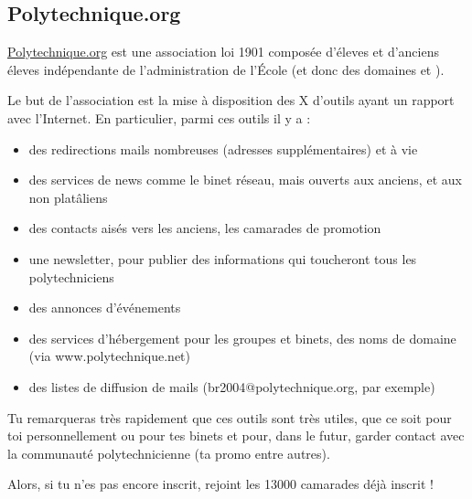 \subsection{Polytechnique.org}
\url{Polytechnique.org} est une association loi 1901 compos\'ee d'\'eleves et d'anciens \'eleves 
 ind\'ependante de l'administration de l'\'Ecole (et donc des domaines 
 et ).


Le but de l'association est la mise \`a disposition des X d'outils ayant un rapport avec l'Internet. En particulier, parmi ces outils il y a :
\begin{itemize}
  \item des redirections mails nombreuses (adresses suppl\'ementaires) et \`a vie
  \item des services de news comme le binet r\'eseau, mais ouverts aux anciens, et aux non plat\^aliens
  \item des contacts ais\'es vers les anciens, les camarades de promotion
  \item une newsletter, pour publier des informations qui toucheront tous les polytechniciens
  \item des annonces d'\'ev\'enements
  \item des services d'h\'ebergement pour les groupes et binets, des noms de domaine (via www.polytechnique.net)
  \item des listes de diffusion de mails (br2004@polytechnique.org, par exemple)
\end{itemize}


Tu remarqueras tr\`es rapidement que ces outils sont tr\`es utiles, que ce soit pour toi personnellement ou pour tes binets et pour, dans le futur, garder contact avec la communaut\'e polytechnicienne (ta promo entre autres).


Alors, si tu n'es pas encore inscrit, rejoint les 13000 camarades d\'ej\`a inscrit !
